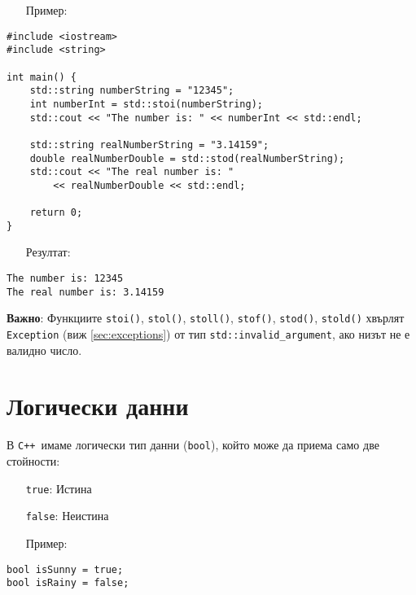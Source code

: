 \documentclass[oneside]{book}
\newcommand*{\code}[1]{\texttt{#1}}
\newcommand*{\cpp}{\texttt{C++}\ }
\begin{document}
\begin{itemize}\item[Пример:]\end{itemize}
\begin{mdframed}\begin{lstlisting}
#include <iostream>
#include <string>

int main() {
    std::string numberString = "12345";
    int numberInt = std::stoi(numberString);
    std::cout << "The number is: " << numberInt << std::endl;

    std::string realNumberString = "3.14159";
    double realNumberDouble = std::stod(realNumberString);
    std::cout << "The real number is: "
        << realNumberDouble << std::endl;

    return 0;
}
\end{lstlisting}\end{mdframed}

\begin{itemize}\item[Резултат:]\end{itemize}
\begin{mdframed}\begin{lstlisting}[language={}]
The number is: 12345
The real number is: 3.14159
\end{lstlisting}\end{mdframed}

\textbf{Важно}: Функциите \code{stoi()}, \code{stol()}, \code{stoll()}, \code{stof()}, \code{stod()}, \code{stold()} хвърлят \code{Exception} (виж \ref{sec:exceptions}) от тип \code{std::invalid\_argument}, ако низът не е валидно число.

\section{Логически данни}
В \cpp имаме логически тип данни (\code{bool}), който може да приема само две стойности:

\begin{itemize}
    \item[] \code{true}: Истина
    \item[] \code{false}: Неистина
\end{itemize}
\pagebreak
\begin{itemize}\item[Пример:]\end{itemize}
\begin{mdframed}\begin{lstlisting}
bool isSunny = true;
bool isRainy = false;
\end{lstlisting}\end{mdframed}
\end{document}
